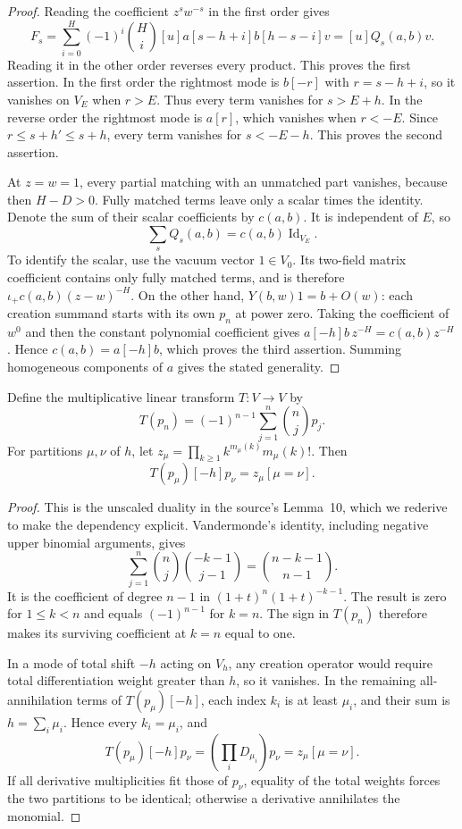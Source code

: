 \begin{proof}
Reading the coefficient $z^sw^{-s}$ in the first order gives
\[
 F_s=\sum_{i=0}^H(-1)^i\binom Hi
       [u]a[s-h+i]b[h-s-i]v=[u]Q_s(a,b)v.
\]
Reading it in the other order reverses every product. This proves
the first assertion. In the first order the rightmost mode is
$b[-r]$ with $r=s-h+i$, so it vanishes on $V_E$ when $r>E$.
Thus every term vanishes for $s>E+h$. In the reverse order the
rightmost mode is $a[r]$, which vanishes when $r<-E$. Since
$r\le s+h'\le s+h$, every term vanishes for $s<-E-h$.
This proves the second assertion.

At $z=w=1$, every partial matching with an unmatched part vanishes,
because then $H-D>0$. Fully matched terms leave only a scalar
times the identity. Denote the sum of their scalar coefficients by
$c(a,b)$. It is independent of $E$, so
\[
 \sum_s Q_s(a,b)=c(a,b)\operatorname{Id}_{V_E}.
\]
To identify the scalar, use the vacuum vector $1\in V_0$.
Its two-field matrix coefficient contains only fully matched terms,
and is therefore $\iota_+c(a,b)(z-w)^{-H}$. On the other hand,
$Y(b,w)1=b+O(w)$: each creation summand starts with its own
$p_n$ at power zero. Taking the coefficient of $w^0$ and then
the constant polynomial coefficient gives
$a[-h]b\,z^{-H}=c(a,b)z^{-H}$. Hence $c(a,b)=a[-h]b$,
which proves the third assertion. Summing homogeneous components
of $a$ gives the stated generality.
\end{proof}

\begin{lemma}
\label{lem:elementary-crossing-duality}
Define the multiplicative linear transform $T:V\to V$ by
\[
 T(p_n)=(-1)^{n-1}\sum_{j=1}^n\binom njp_j.
\]
For partitions $\mu,\nu$ of $h$, let
$z_\mu=\prod_{k\ge1}k^{m_\mu(k)}m_\mu(k)!$. Then
\[
 T(p_\mu)[-h]p_\nu=z_\mu[\mu=\nu].
\]
\end{lemma}

\begin{proof}
This is the unscaled duality in the source's Lemma~10, which we
rederive to make the dependency explicit. Vandermonde's identity,
including negative upper binomial arguments, gives
\[
 \sum_{j=1}^n\binom nj\binom{-k-1}{j-1}
   =\binom{n-k-1}{n-1}.
\]
It is the coefficient of degree $n-1$ in
$(1+t)^n(1+t)^{-k-1}$. The result is zero for $1\le k<n$
and equals $(-1)^{n-1}$ for $k=n$. The sign in $T(p_n)$
therefore makes its surviving coefficient at $k=n$ equal to one.

In a mode of total shift $-h$ acting on $V_h$, any creation
operator would require total differentiation weight greater than
$h$, so it vanishes. In the remaining all-annihilation terms of
$T(p_\mu)[-h]$, each index $k_i$ is at least $\mu_i$, and their
sum is $h=\sum_i\mu_i$. Hence every $k_i=\mu_i$, and
\[
 T(p_\mu)[-h]p_\nu
   =\left(\prod_i D_{\mu_i}\right)p_\nu
   =z_\mu[\mu=\nu].
\]
If all derivative multiplicities fit those of $p_\nu$, equality
of the total weights forces the two partitions to be identical;
otherwise a derivative annihilates the monomial.
\end{proof}

